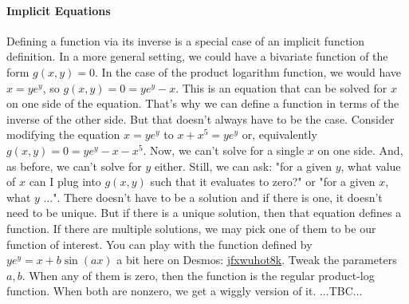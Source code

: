 

\paragraph{Implicit Equations}
Defining a function via its inverse is a special case of an implicit function definition. In a more general setting, we could have a bivariate function of the form $g(x,y) = 0$. In the case of the product logarithm function, we would have $x = y e^y$, so $g(x,y) = 0 = y e^y - x$.  This is an equation that can be solved for $x$ on one side of the equation. That's why we can define a function in terms of the inverse of the other side. But that doesn't always have to be the case. Consider modifying the equation $x = y e^y$ to $x + x^5 = y e^y$ or, equivalently $g(x,y) = 0 = y e^y - x - x^5$. Now, we can't  solve for a single $x$ on one side. And, as before, we can't solve for $y$ either. Still, we can ask: "for a given $y$, what value of $x$ can I plug into $g(x,y)$ such that it evaluates to zero?" or "for a given $x$, what $y$ ...". There doesn't have to be a solution and if there is one, it doesn't need to be unique. But if there is a unique solution, then that equation defines a function. If there are multiple solutions, we may pick one of them to be our function of interest. You can play with the function defined by $ y e^y = x + b \sin(a x)$ a bit here on Desmos: \href{https://www.desmos.com/calculator/jfxwuhot8k}{jfxwuhot8k}. Tweak the parameters $a,b$. When any of them is zero, then the function is the regular product-log function. When both are nonzero, we get a wiggly version of it. ...TBC...








